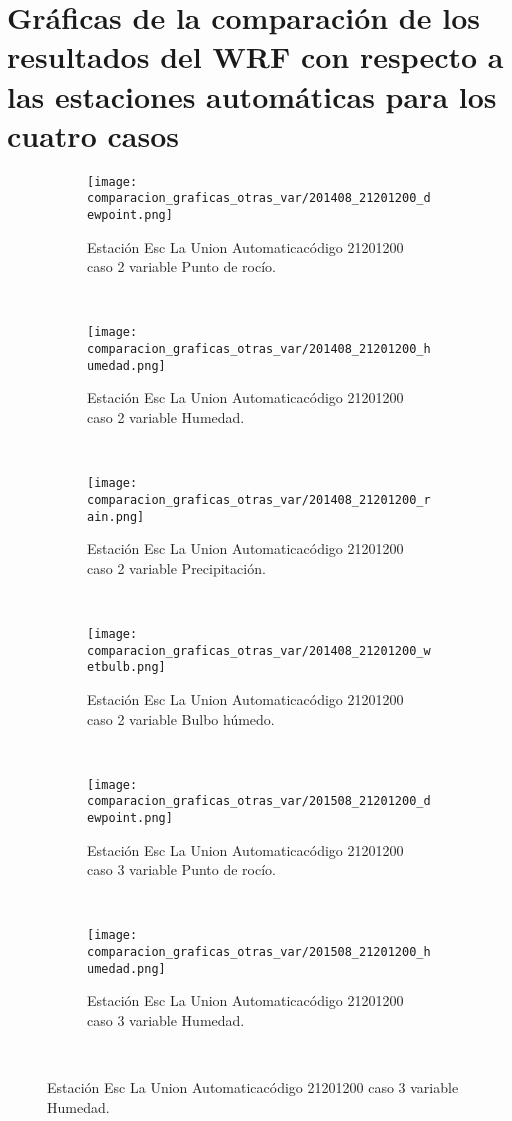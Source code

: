 \chapter{Gráficas de la comparación de los resultados del WRF con respecto a las estaciones automáticas para los cuatro casos}



\label{anexo:graficas_otras_variables_wrf}


\begin{figure}
\begin{subfigure}[normla]{0.4\textwidth}
\caption{Estación Esc La Union Automaticacódigo 21201200 caso 2 variable Punto de rocío.}
\texttt{[image: comparacion\_graficas\_otras\_var/201408\_21201200\_dewpoint.png]}
\end{subfigure}
~
\begin{subfigure}[normla]{0.4\textwidth}
\caption{Estación Esc La Union Automaticacódigo 21201200 caso 2 variable Humedad.}
\texttt{[image: comparacion\_graficas\_otras\_var/201408\_21201200\_humedad.png]}
\end{subfigure}
~
\begin{subfigure}[normla]{0.4\textwidth}
\caption{Estación Esc La Union Automaticacódigo 21201200 caso 2 variable Precipitación.}
\texttt{[image: comparacion\_graficas\_otras\_var/201408\_21201200\_rain.png]}
\end{subfigure}
~
\begin{subfigure}[normla]{0.4\textwidth}
\caption{Estación Esc La Union Automaticacódigo 21201200 caso 2 variable Bulbo húmedo.}
\texttt{[image: comparacion\_graficas\_otras\_var/201408\_21201200\_wetbulb.png]}
\end{subfigure}
~
\begin{subfigure}[normla]{0.4\textwidth}
\caption{Estación Esc La Union Automaticacódigo 21201200 caso 3 variable Punto de rocío.}
\texttt{[image: comparacion\_graficas\_otras\_var/201508\_21201200\_dewpoint.png]}
\end{subfigure}
~
\begin{subfigure}[normla]{0.4\textwidth}
\caption{Estación Esc La Union Automaticacódigo 21201200 caso 3 variable Humedad.}
\texttt{[image: comparacion\_graficas\_otras\_var/201508\_21201200\_humedad.png]}
\end{subfigure}
~
\end{figure}
           
